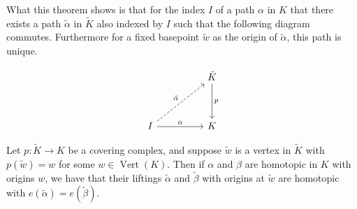 What this theorem shows is that for the index $I$ of a path $\alpha$ in $K$ that there exists a path $\tilde{\alpha}$ in $\tilde{K}$ also indexed by $I$ such that the following diagram commutes. Furthermore for a fixed basepoint $\tilde{w}$ as the origin of $\tilde{\alpha}$, this path is unique.


\begin{equation*}
    \begin{tikzcd}[ampersand replacement=\&, sep=huge]
      \& \tilde{K} \arrow[d,"p"] \\
    I \arrow[ur,dashrightarrow,"\tilde{\alpha}"] \arrow[r,"\alpha"] \& K
  \end{tikzcd}
\end{equation*}

\begin{lemma}
  \label{lem:lift-homo}
  Let $p:\tilde{K} \rightarrow K$ be a covering complex, and suppose $\tilde{w}$ is a vertex in $\tilde{K}$ with $p(\tilde{w}) = w $ for some $w \in \operatorname{Vert}(K)$. Then if $\alpha$ and $\beta$ are homotopic in $K$ with origins $w$, we have that their liftings $\tilde{\alpha}$ and $\tilde{\beta}$ with origins at $\tilde{w}$ are homotopic with $e(\tilde{\alpha}) = e(\tilde{\beta})$.
\end{lemma}

